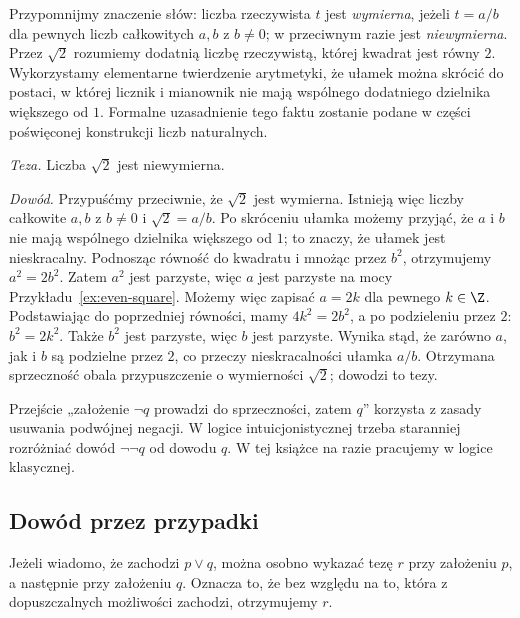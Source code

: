 \begin{przyklad}
\label{ex:sqrt-two}
Przypomnijmy znaczenie słów: liczba rzeczywista $t$
jest \emph{wymierna}, jeżeli $t=a/b$ dla pewnych
liczb całkowitych $a,b$ z $b\ne0$; w przeciwnym
razie jest \emph{niewymierna}. Przez $\sqrt2$
rozumiemy dodatnią liczbę rzeczywistą, której
kwadrat jest równy $2$. Wykorzystamy elementarne
twierdzenie arytmetyki, że ułamek można skrócić
do postaci, w której licznik i mianownik nie mają
wspólnego dodatniego dzielnika większego od $1$.
Formalne uzasadnienie tego faktu zostanie podane
w części poświęconej konstrukcji liczb naturalnych.

\emph{Teza.} Liczba $\sqrt2$ jest niewymierna.

\emph{Dowód.} Przypuśćmy przeciwnie, że $\sqrt2$
jest wymierna. Istnieją więc liczby całkowite
$a,b$ z $b\ne0$ i $\sqrt2=a/b$. Po skróceniu
ułamka możemy przyjąć, że $a$ i $b$ nie mają
wspólnego dzielnika większego od $1$; to znaczy,
że ułamek jest nieskracalny. Podnosząc równość
do kwadratu i mnożąc przez $b^2$, otrzymujemy
$a^2=2b^2$. Zatem $a^2$ jest parzyste, więc
$a$ jest parzyste na mocy Przykładu~\ref{ex:even-square}.
Możemy więc zapisać $a=2k$ dla pewnego $k\in\Z$.
Podstawiając do poprzedniej równości, mamy
$4k^2=2b^2$, a po podzieleniu przez $2$:
$b^2=2k^2$. Także $b^2$ jest parzyste, więc
$b$ jest parzyste. Wynika stąd, że zarówno $a$,
jak i $b$ są podzielne przez $2$, co przeczy
nieskracalności ułamka $a/b$. Otrzymana
sprzeczność obala przypuszczenie o wymierności
$\sqrt2$; dowodzi to tezy.
\end{przyklad}

\begin{uwaga}
Przejście „założenie $\neg q$ prowadzi do sprzeczności,
zatem $q$” korzysta z zasady usuwania podwójnej
negacji. W logice intuicjonistycznej trzeba staranniej
rozróżniać dowód $\neg\neg q$ od dowodu $q$.
W tej książce na razie pracujemy w logice klasycznej.
\end{uwaga}

\subsection{Dowód przez przypadki}\label{sec:proof-by-cases}
Jeżeli wiadomo, że zachodzi $p\lor q$, można
osobno wykazać tezę $r$ przy założeniu $p$,
a następnie przy założeniu $q$. Oznacza to,
że bez względu na to, która z dopuszczalnych
możliwości zachodzi, otrzymujemy $r$.

